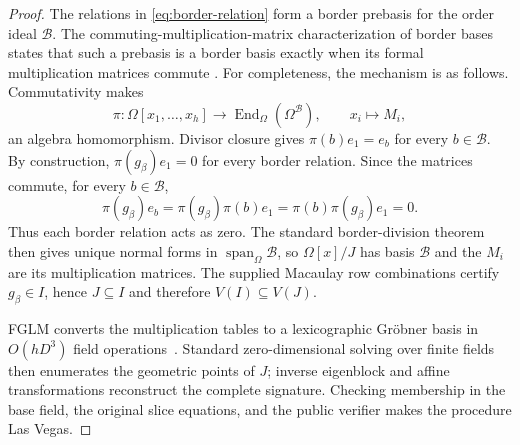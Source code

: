 \documentclass[11pt]{article}
\newcommand{\Span}{\operatorname{span}}
\begin{document}
\begin{proof}
The relations in \eqref{eq:border-relation} form a border prebasis for the
order ideal $\mathcal B$.  The commuting-multiplication-matrix
characterization of border bases states that such a prebasis is a border basis
exactly when its formal multiplication matrices commute
\cite{KehreinKreuzer2005}.  For completeness, the mechanism is as follows.
Commutativity makes
\[
 \pi:\Omega[x_1,\ldots,x_h]\longrightarrow
      \operatorname{End}_\Omega(\Omega^{\mathcal B}),
 \qquad x_i\longmapsto M_i,
\]
an algebra homomorphism.  Divisor closure gives
$\pi(b)e_1=e_b$ for every $b\in\mathcal B$.  By construction,
$\pi(g_\beta)e_1=0$ for every border relation.  Since the matrices commute,
for every $b\in\mathcal B$,
\[
 \pi(g_\beta)e_b
 =\pi(g_\beta)\pi(b)e_1
 =\pi(b)\pi(g_\beta)e_1=0.
\]
Thus each border relation acts as zero.  The standard border-division theorem
then gives unique normal forms in $\Span_\Omega\mathcal B$, so
$\Omega[x]/J$ has basis $\mathcal B$ and the $M_i$ are its multiplication
matrices.  The supplied Macaulay row combinations certify
$g_\beta\in I$, hence $J\subseteq I$ and therefore $V(I)\subseteq V(J)$.

FGLM converts the multiplication tables to a lexicographic Gr\"obner basis in
$O(hD^3)$ field operations~\cite{FaugereEtAl1993FGLM}.  Standard
zero-dimensional solving over finite fields then enumerates the geometric
points of $J$; inverse eigenblock and affine transformations reconstruct the
complete signature.  Checking membership in the base field, the original
slice equations, and the public verifier makes the procedure Las Vegas.
\end{proof}
\end{document}
